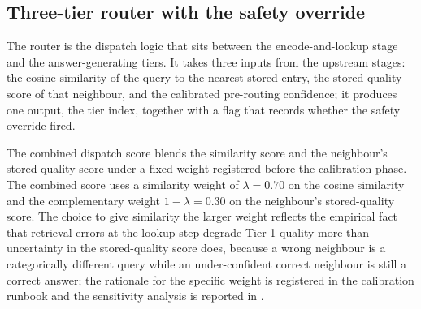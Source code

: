 \subsection{Three-tier router with the safety override}
\label{sec:router}

The router is the dispatch logic that sits between the encode-and-lookup stage and the answer-generating tiers. It takes three inputs from the upstream stages: the cosine similarity of the query to the nearest stored entry, the stored-quality score of that neighbour, and the calibrated pre-routing confidence; it produces one output, the tier index, together with a flag that records whether the safety override fired.

The combined dispatch score blends the similarity score and the neighbour's stored-quality score under a fixed weight registered before the calibration phase. The combined score uses a similarity weight of $\lambda = 0.70$ on the cosine similarity and the complementary weight $1-\lambda = 0.30$ on the neighbour's stored-quality score. The choice to give similarity the larger weight reflects the empirical fact that retrieval errors at the lookup step degrade Tier 1 quality more than uncertainty in the stored-quality score does, because a wrong neighbour is a categorically different query while an under-confident correct neighbour is still a correct answer; the rationale for the specific weight is registered in the calibration runbook and the sensitivity analysis is reported in .

